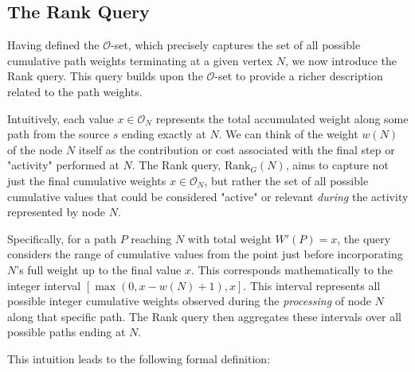\begin{example}[$\mathcal{O}$-Set Calculation]
\end{example}

\subsection{The Rank Query}
\label{subsec:rank_dag_def}

Having defined the $\mathcal{O}$-set, which precisely captures the set of all possible cumulative path weights terminating at a given vertex $N$, we now introduce the Rank query. This query builds upon the $\mathcal{O}$-set to provide a richer description related to the path weights.

Intuitively, each value $x \in \mathcal{O}_N$ represents the total accumulated weight along some path from the source $s$ ending exactly at $N$. We can think of the weight $w(N)$ of the node $N$ itself as the contribution or cost associated with the final step or "activity" performed at $N$. The Rank query, $\mathrm{Rank}_G(N)$, aims to capture not just the final cumulative weights $x \in \mathcal{O}_N$, but rather the set of all possible cumulative values that could be considered "active" or relevant \emph{during} the activity represented by node $N$.

Specifically, for a path $P$ reaching $N$ with total weight $W'(P)=x$, the query considers the range of cumulative values from the point just before incorporating $N$'s full weight up to the final value $x$. This corresponds mathematically to the integer interval $[\max(0, x - w(N) + 1), x]$. This interval represents all possible integer cumulative weights observed during the \emph{processing} of node $N$ along that specific path. The Rank query then aggregates these intervals over all possible paths ending at $N$.

This intuition leads to the following formal definition:

